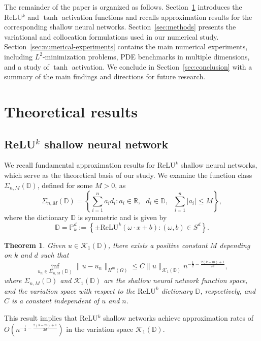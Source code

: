 \documentclass{article}
\newtheorem{theorem}{Theorem}
\theoremstyle{remark}
\begin{document}
\medskip
\noindent
The remainder of the paper is organized as follows. 
Section~\ref{sec:theoretical-results} introduces the ReLU$^k$ and $\tanh$ activation functions and recalls approximation results for the corresponding shallow neural networks.
Section~\ref{sec:methods} presents the variational and collocation formulations used in our numerical study. 
Section~\ref{sec:numerical-experiments} contains the main numerical experiments, including $L^2$-minimization problems, PDE benchmarks in multiple dimensions, and a study of $\tanh$ activation. 
We conclude in Section~\ref{sec:conclusion} with a summary of the main findings and directions for future research.



\section{Theoretical results}\label{sec:theoretical-results}

\subsection{ReLU$^k$ shallow neural network}
We recall fundamental approximation results for ReLU$^k$ shallow neural networks, which serve as the theoretical basis of our study. 
We examine the function class $\Sigma_{n, M} (\mathbb{D})$, defined for some $M > 0$, as
\begin{equation}\label{eq:sigma_n_M}
\Sigma_{n,M} (\mathbb{D}) = \left\{ \sum_{i=1}^n a_i d_i : a_i \in \mathbb{R}, \text{ } d_i \in \mathbb{D}, \text{ } \sum_{i = 1}^n |a_i| \leq M \right\},
\end{equation}
where the dictionary $\mathbb{D}$ is symmetric and is given by
\begin{equation}
\label{dictionary}
\mathbb{D} = \mathbb{P}_k^d:=
\left\{ \pm \text{ReLU}^k (\omega \cdot x + b ) :  (\omega,b) \in S^{d} \right\}.
\end{equation}

\begin{theorem}{\cite{SX:2024}}
Given $u \in \mathcal{K}_1(\mathbb{D})$, there exists a positive constant $M$ depending on $k$ and $d$ such that
\[
\inf_{u_n \in \Sigma_{n, M}(\mathbb{D})} \| u - u_n \|_{H^m(\Omega)} \leq C \| u \|_{\mathcal{K}_1(\mathbb{D})} n^{-\frac{1}{2} - \frac{2(k-m)+1}{2d}},
\]
where $\Sigma_{n, M}(\mathbb{D})$ and $\mathcal{K}_1(\mathbb{D})$ are the shallow neural network function space, and the variation space with respect to the $\text{ReLU}^k$ dictionary $\mathbb{D}$, respectively, and $C$ is a constant independent of $u$ and $n$.
\end{theorem}
This result implies that ReLU$^k$ shallow networks achieve approximation rates of $O(n^{-\frac{1}{2} - \frac{2(k-m)+1}{2d}})$ in the variation space $\mathcal{K}_1(\mathbb{D})$. 
\end{document}
